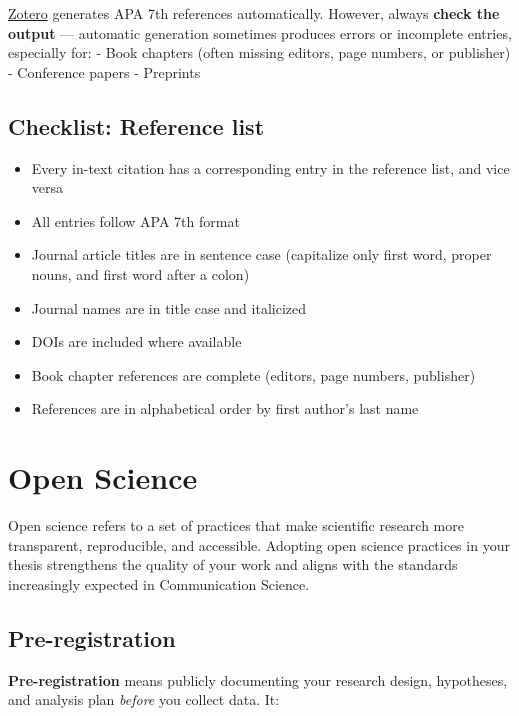 \documentclass[
  11pt,
  a4paper,
]{scrbook}
\providecommand{\tightlist}{%
  \setlength{\itemsep}{0pt}\setlength{\parskip}{0pt}}\usepackage{longtable,booktabs,array}
\begin{document}
\href{https://www.zotero.org}{Zotero} generates APA 7th references
automatically. However, always \textbf{check the output} --- automatic
generation sometimes produces errors or incomplete entries, especially
for: - Book chapters (often missing editors, page numbers, or publisher)
- Conference papers - Preprints

\section{Checklist: Reference list}\label{checklist-reference-list}

\begin{itemize}
\tightlist
\item[$\square$]
  Every in-text citation has a corresponding entry in the reference
  list, and vice versa
\item[$\square$]
  All entries follow APA 7th format
\item[$\square$]
  Journal article titles are in sentence case (capitalize only first
  word, proper nouns, and first word after a colon)
\item[$\square$]
  Journal names are in title case and italicized
\item[$\square$]
  DOIs are included where available
\item[$\square$]
  Book chapter references are complete (editors, page numbers,
  publisher)
\item[$\square$]
  References are in alphabetical order by first author's last name
\end{itemize}

\chapter{Open Science}\label{open-science}

Open science refers to a set of practices that make scientific research
more transparent, reproducible, and accessible. Adopting open science
practices in your thesis strengthens the quality of your work and aligns
with the standards increasingly expected in Communication Science.

\section{Pre-registration}\label{pre-registration-1}

\textbf{Pre-registration} means publicly documenting your research
design, hypotheses, and analysis plan \emph{before} you collect data.
It:
\end{document}
